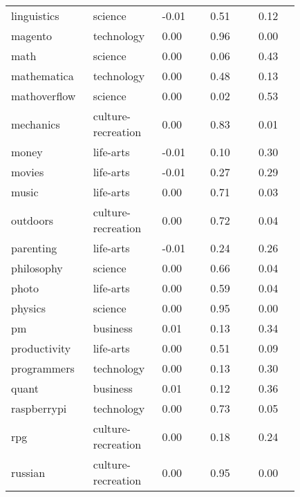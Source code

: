 \begin{longtabu}{@{}
	p{0.2\linewidth}
	p{0.2\linewidth}
	P{0.15\linewidth}
	P{0.15\linewidth}
	P{0.13\linewidth}@{}}
linguistics      & science            & -0.01       & 0.51          & 0.12           \\
magento          & technology         & 0.00        & 0.96          & 0.00           \\
math             & science            & 0.00        & 0.06          & 0.43           \\
mathematica      & technology         & 0.00        & 0.48          & 0.13           \\
mathoverflow     & science            & 0.00        & 0.02          & 0.53           \\
mechanics        & culture-recreation & 0.00        & 0.83          & 0.01           \\
money            & life-arts          & -0.01       & 0.10          & 0.30           \\
movies           & life-arts          & -0.01       & 0.27          & 0.29           \\
music            & life-arts          & 0.00        & 0.71          & 0.03           \\
outdoors         & culture-recreation & 0.00        & 0.72          & 0.04           \\
parenting        & life-arts          & -0.01       & 0.24          & 0.26           \\
philosophy       & science            & 0.00        & 0.66          & 0.04           \\
photo            & life-arts          & 0.00        & 0.59          & 0.04           \\
physics          & science            & 0.00        & 0.95          & 0.00           \\
pm               & business           & 0.01        & 0.13          & 0.34           \\
productivity     & life-arts          & 0.00        & 0.51          & 0.09           \\
programmers      & technology         & 0.00        & 0.13          & 0.30           \\
quant            & business           & 0.01        & 0.12          & 0.36           \\
raspberrypi      & technology         & 0.00        & 0.73          & 0.05           \\
rpg              & culture-recreation & 0.00        & 0.18          & 0.24           \\
russian          & culture-recreation & 0.00        & 0.95          & 0.00           \\

\end{longtabu}

